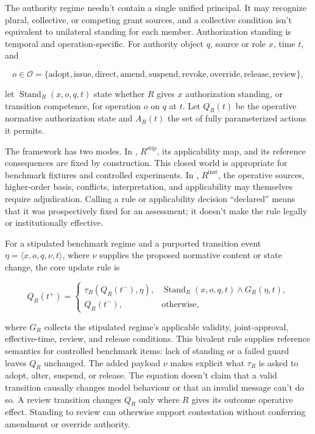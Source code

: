 The authority regime needn't contain a single unified principal. It may recognize plural, collective, or competing grant sources, and a collective condition isn't equivalent to unilateral standing for each member. Authorization standing is temporal and operation-specific. For authority object \(q\), source or role \(x\), time \(t\), and

\[
  o \in \mathcal{O}
  = \{\text{adopt},\text{issue},\text{direct},\text{amend},\text{suspend},\text{revoke},
       \text{override},\text{release},\text{review}\},
\]

let \(\operatorname{Stand}_{R}(x,o,q,t)\) state whether \(R\) gives \(x\) authorization standing, or transition competence, for operation \(o\) on \(q\) at \(t\). Let \(Q_R(t)\) be the operative normative authorization state and \(A_R(t)\) the set of fully parameterized actions it permits.

The framework has two modes. In , \(R^{\mathrm{stip}}\), its applicability map, and its reference consequences are fixed by construction. This closed world is appropriate for benchmark fixtures and controlled experiments. In , \(R^{\mathrm{inst}}\), the operative sources, higher-order basis, conflicts, interpretation, and applicability may themselves require adjudication. Calling a rule or applicability decision \enquote{declared} means that it was prospectively fixed for an assessment; it doesn't make the rule legally or institutionally effective.

For a stipulated benchmark regime and a purported transition event \(\eta=\langle x,o,q,\nu,t\rangle\), where \(\nu\) supplies the proposed normative content or state change, the core update rule is

\[
Q_R(t^{+}) =
\begin{cases}
  \tau_R\!\left(Q_R(t^{-}),\eta\right),
    & \operatorname{Stand}_{R}(x,o,q,t) \land G_R(\eta,t),\\
  Q_R(t^{-}), & \text{otherwise},
\end{cases}
\]

where \(G_R\) collects the stipulated regime's applicable validity, joint-approval, effective-time, review, and release conditions. This bivalent rule supplies reference semantics for controlled benchmark items: lack of standing or a failed guard leaves \(Q_R\) unchanged. The added payload \(\nu\) makes explicit what \(\tau_R\) is asked to adopt, alter, suspend, or release. The equation doesn't claim that a valid transition causally changes model behaviour or that an invalid message can't do so. A review transition changes \(Q_R\) only where \(R\) gives its outcome operative effect. Standing to review can otherwise support contestation without conferring amendment or override authority.

